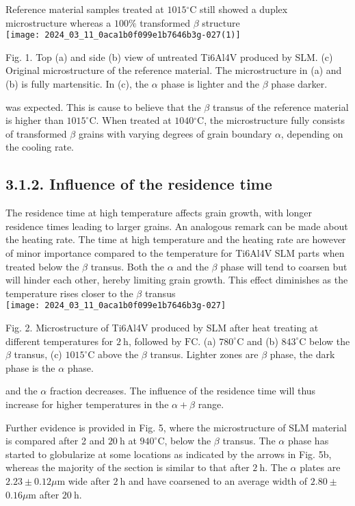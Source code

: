 \documentclass[10pt]{article}
\begin{document}
Reference material samples treated at $1015{ }^{\circ} \mathrm{C}$ still showed a duplex microstructure whereas a $100 \%$ transformed $\beta$ structure\\
\texttt{[image: 2024\_03\_11\_0aca1b0f099e1b7646b3g-027(1)]}

Fig. 1. Top (a) and side (b) view of untreated Ti6Al4V produced by SLM. (c) Original microstructure of the reference material. The microstructure in (a) and (b) is fully martensitic. In (c), the $\alpha$ phase is lighter and the $\beta$ phase darker.

was expected. This is cause to believe that the $\beta$ transus of the reference material is higher than $1015^{\circ} \mathrm{C}$. When treated at $1040{ }^{\circ} \mathrm{C}$, the microstructure fully consists of transformed $\beta$ grains with varying degrees of grain boundary $\alpha$, depending on the cooling rate.

\subsection*{3.1.2. Influence of the residence time}
The residence time at high temperature affects grain growth, with longer residence times leading to larger grains. An analogous remark can be made about the heating rate. The time at high temperature and the heating rate are however of minor importance compared to the temperature for Ti6Al4V SLM parts when treated below the $\beta$ transus. Both the $\alpha$ and the $\beta$ phase will tend to coarsen but will hinder each other, hereby limiting grain growth. This effect diminishes as the temperature rises closer to the $\beta$ transus\\
\texttt{[image: 2024\_03\_11\_0aca1b0f099e1b7646b3g-027]}

Fig. 2. Microstructure of Ti6Al4V produced by SLM after heat treating at different temperatures for $2 \mathrm{~h}$, followed by $\mathrm{FC}$. (a) $780^{\circ} \mathrm{C}$ and (b) $843^{\circ} \mathrm{C}$ below the $\beta$ transus, (c) $1015^{\circ} \mathrm{C}$ above the $\beta$ transus. Lighter zones are $\beta$ phase, the dark phase is the $\alpha$ phase.

and the $\alpha$ fraction decreases. The influence of the residence time will thus increase for higher temperatures in the $\alpha+\beta$ range.

Further evidence is provided in Fig. 5, where the microstructure of SLM material is compared after 2 and $20 \mathrm{~h}$ at $940^{\circ} \mathrm{C}$, below the $\beta$ transus. The $\alpha$ phase has started to globularize at some locations as indicated by the arrows in Fig. 5b, whereas the majority of the section is similar to that after $2 \mathrm{~h}$. The $\alpha$ plates are $2.23 \pm 0.12 \mu \mathrm{m}$ wide after $2 \mathrm{~h}$ and have coarsened to an average width of $2.80 \pm$ $0.16 \mu \mathrm{m}$ after $20 \mathrm{~h}$.
\end{document}

